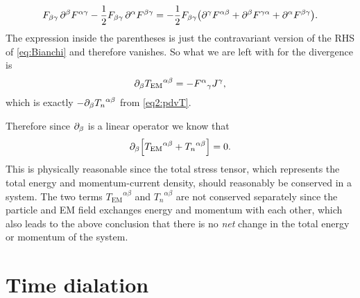 \documentclass[11pt,a4paper, 
swedish, english %
]{article}
\newcommand{\EM}{\text{EM}}
\begin{document}
\begin{equation}
F_{\beta\gamma} \,\partial^\beta F^{\alpha\gamma}
-\frac{1}{2}F_{\beta\gamma}\,\partial^\alpha F^{\beta\gamma}=
-\frac{1}{2}F_{\beta\gamma}\qty( 
\partial^\gamma F^{\alpha\beta}
+\partial^\beta F^{\gamma\alpha}
+\partial^\alpha F^{\beta\gamma}).
\end{equation}
The expression inside the parentheses is just the contravariant version
of the RHS of \eqref{eq:Bianchi} and therefore vanishes.
So what we are left with for the divergence is
\begin{equation}
\pd_{\beta}{T_{\EM}}^{\alpha\beta}=-{F^{\alpha}}_\gamma J^\gamma,
\end{equation}
which is exactly $-\partial_\beta{T_n}^{\alpha\beta}$ from \eqref{eq2:pdvT}.

Therefore since $\partial_\beta$ is a linear operator we know that
\begin{equation}
\pd_{\beta}\qty[{T_{\EM}}^{\alpha\beta}+{T_n}^{\alpha\beta}]=0.
\end{equation}
This is physically reasonable since the total stress tensor, which
represents the total energy and momentum-current density, should
reasonably be conserved in a system. The two terms
${T_{\EM}}^{\alpha\beta}$ and ${T_n}^{\alpha\beta}$ are not conserved
separately since the particle and EM field exchanges energy and
momentum with each other, which also leads to the above conclusion
that there is no \emph{net} change in the total energy or momentum of
the system.





\renewcommand{\thesubsection}{\arabic{section} (\roman{subsection})}
\section{Time dialation}

\begin{figure}\centering
\caption{}
\label{fig:}
\end{figure}



\end{document}
